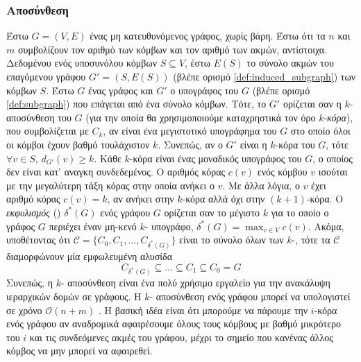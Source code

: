 \subsubsection{ Αποσύνθεση}
Έστω $G = (V,E)$ ένας μη κατευθυνόμενος γράφος, χωρίς βάρη.
Έστω ότι τα $n$ και $m$ συμβολίζουν τον αριθμό των κόμβων και τον αριθμό των ακμών, αντίστοιχα.
Δεδομένου ενός υποσυνόλου κόμβων $S \subseteq V$, έστω $E(S)$ το σύνολο ακμών του επαγόμενου γράφου $G'=(S,E(S))$  (βλέπε  ορισμό \ref{def:induced_subgraph}) των κόμβων $S$.
Έστω $G$ ένας γράφος και $G'$ ο υπογράφος του $G$ (βλέπε ορισμό \ref{def:subgraph}) που επάγεται από ένα σύνολο κόμβων.
Τότε, το $G'$ ορίζεται σαν η $k$- αποσύνθεση του $G$ (για την οποία θα χρησιμοποιούμε καταχρηστικά τον όρο $k$-\textit{κόρα}), που συμβολίζεται με $C_k$, αν είναι ένα μεγιστοτικό υπογράφημα του $G$ στο οποίο όλοι οι κόμβοι έχουν βαθμό τουλάχιστον $k$.
Συνεπώς, αν ο $G'$ είναι η $k$-κόρα του $G$, τότε $\forall v \in S$, $d_{G'}(v) \geq k$.
Κάθε $k$-κόρα είναι ένας μοναδικός υπογράφος του $G$, ο οποίος δεν είναι κατ' αναγκη συνδεδεμένος.
Ο αριθμός κόρας $c(v)$ ενός κόμβου $v$ ισούται με την μεγαλύτερη τάξη κόρας στην οποία ανήκει ο $v$.
Με άλλα λόγια, ο $v$ έχει αριθμό κόρας $c(v) = k$, αν ανήκει στην $k$-κόρα αλλά όχι στην $(k+1)$-κόρα.
Ο \textit{εκφυλισμός} () $\delta^*(G)$ ενός γράφου $G$ ορίζεται σαν το μέγιστο $k$ για το οποίο ο γράφος $G$ περιέχει έναν μη-κενό $k$- υπογράφο, $\delta^*(G) = \max_{v \in V}c(v)$.
Ακόμα, υποθέτοντας ότι $\mathcal{C} = \{  C_0, C_1, \ldots, C_{\delta^*(G)} \}$ είναι το σύνολο όλων των $k$-, τότε τα $\mathcal{C}$ διαμορφώνουν μία εμφωλευμένη αλυσίδα
\begin{equation}
    C_{\delta^*(G)} \subseteq \ldots \subseteq C_1 \subseteq C_0 = G
\end{equation}
Συνεπώς, η $k$- αποσύνθεση είναι ένα πολύ χρήσιμο εργαλείο για την ανακάλυψη ιεραρχικών δομών σε γράφους.
Η $k$- αποσύνθεση ενός γράφου μπορεί να υπολογιστεί σε χρόνο $\mathcal{O}(n+m)$ \cite{matula1983smallest,batagelj2011fast}.
Η βασική ιδέα είναι ότι μπορούμε να πάρουμε την $i$-κόρα ενός γράφου αν αναδρομικά αφαιρέσουμε όλους τους κόμβους με βαθμό μικρότερο του $i$ και τις συνδεόμενες ακμές του γράφου, μέχρι το σημείο που κανένας άλλος κόμβος να μην μπορεί να αφαιρεθεί.

